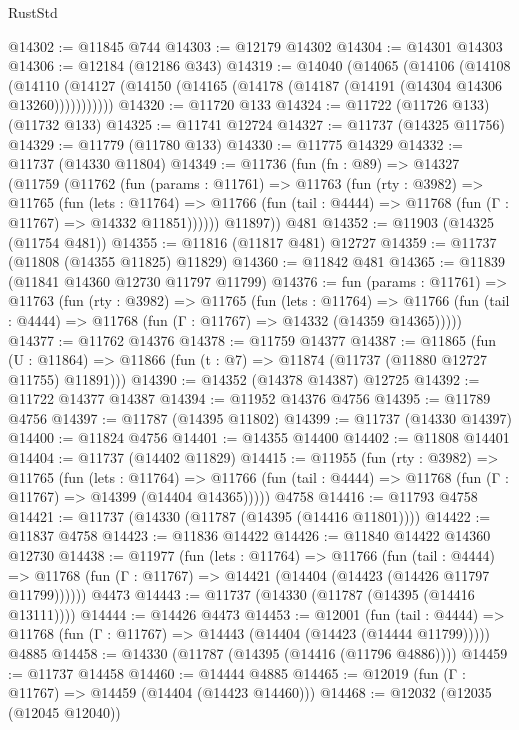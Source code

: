 \begin{lexlean}{RustStd}
\begin{coremodule}
@14302 := @11845 @744
@14303 := @12179 @14302
@14304 := @14301 @14303
@14306 := @12184 (@12186 @343)
@14319 := @14040
    (@14065
      (@14106
        (@14108
          (@14110 (@14127 (@14150 (@14165 (@14178 (@14187 (@14191 (@14304 @14306 @13260)))))))))))
@14320 := @11720 @133
@14324 := @11722 (@11726 @133) (@11732 @133)
@14325 := @11741 @12724
@14327 := @11737 (@14325 @11756)
@14329 := @11779 (@11780 @133)
@14330 := @11775 @14329
@14332 := @11737 (@14330 @11804)
@14349 := @11736
    (fun (fn : @89) =>
    @14327
      (@11759
        (@11762
          (fun (params : @11761) =>
          @11763
            (fun (rty : @3982) =>
            @11765
              (fun (lets : @11764) =>
              @11766 (fun (tail : @4444) => @11768 (fun (Γ : @11767) => @14332 @11851))))))
        @11897))
    @481
@14352 := @11903 (@14325 (@11754 @481))
@14355 := @11816 (@11817 @481) @12727
@14359 := @11737 (@11808 (@14355 @11825) @11829)
@14360 := @11842 @481
@14365 := @11839 (@11841 @14360 @12730 @11797 @11799)
@14376 := fun (params : @11761) =>
  @11763
    (fun (rty : @3982) =>
    @11765
      (fun (lets : @11764) =>
      @11766 (fun (tail : @4444) => @11768 (fun (Γ : @11767) => @14332 (@14359 @14365)))))
@14377 := @11762 @14376
@14378 := @11759 @14377
@14387 := @11865
    (fun (U : @11864) => @11866 (fun (t : @7) => @11874 (@11737 (@11880 @12727 @11755) @11891)))
@14390 := @14352 (@14378 @14387) @12725
@14392 := @11722 @14377 @14387
@14394 := @11952 @14376 @4756
@14395 := @11789 @4756
@14397 := @11787 (@14395 @11802)
@14399 := @11737 (@14330 @14397)
@14400 := @11824 @4756
@14401 := @14355 @14400
@14402 := @11808 @14401
@14404 := @11737 (@14402 @11829)
@14415 := @11955
    (fun (rty : @3982) =>
    @11765
      (fun (lets : @11764) =>
      @11766 (fun (tail : @4444) => @11768 (fun (Γ : @11767) => @14399 (@14404 @14365)))))
    @4758
@14416 := @11793 @4758
@14421 := @11737 (@14330 (@11787 (@14395 (@14416 @11801))))
@14422 := @11837 @4758
@14423 := @11836 @14422
@14426 := @11840 @14422 @14360 @12730
@14438 := @11977
    (fun (lets : @11764) =>
    @11766
      (fun (tail : @4444) =>
      @11768 (fun (Γ : @11767) => @14421 (@14404 (@14423 (@14426 @11797 @11799))))))
    @4473
@14443 := @11737 (@14330 (@11787 (@14395 (@14416 @13111))))
@14444 := @14426 @4473
@14453 := @12001
    (fun (tail : @4444) => @11768 (fun (Γ : @11767) => @14443 (@14404 (@14423 (@14444 @11799)))))
    @4885
@14458 := @14330 (@11787 (@14395 (@14416 (@11796 @4886))))
@14459 := @11737 @14458
@14460 := @14444 @4885
@14465 := @12019 (fun (Γ : @11767) => @14459 (@14404 (@14423 @14460)))
@14468 := @12032 (@12035 (@12045 @12040))

\end{coremodule}
\end{lexlean}
